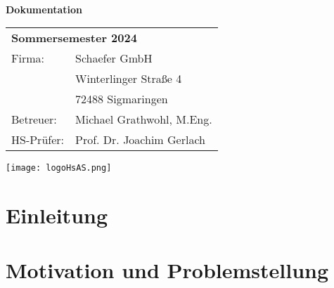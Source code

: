 \documentclass[
	ngerman,
	a4paper,
	twoside
]{scrbook}
\begin{document}
\begin{titlepage}
	\begin{center}
	\vspace*{1cm}
		{\Huge\bfseries\doctitle\\[1em]\large Dokumentation}
	\vspace{1cm}
		\date{\today} %
		
		\docauthor
	\end{center}

	\vspace*{90mm}

	\begin{tabular}{ ll }
		\multicolumn{2}{l}{\textbf{Sommersemester 2024}} \\
		Firma: &  Schaefer GmbH\\
	   	& Winterlinger Straße 4\\
		& 72488 Sigmaringen\\
		Betreuer: & Michael Grathwohl, M.Eng.\\
		HS-Prüfer: & Prof. Dr. Joachim Gerlach
	\end{tabular}
	\vspace{0.5cm}
	\begin{flushright}
    	\texttt{[image: logoHsAS.png]}
	\end{flushright}	
\end{titlepage}




	\tableofcontents
	\listoffigures
	\listoftables
	\lstlistoflistings
	\printnoidxglossary[type=\acronymtype]


\chapter{Einleitung}
	
	
\chapter{Motivation und Problemstellung}	

	
\end{document}
